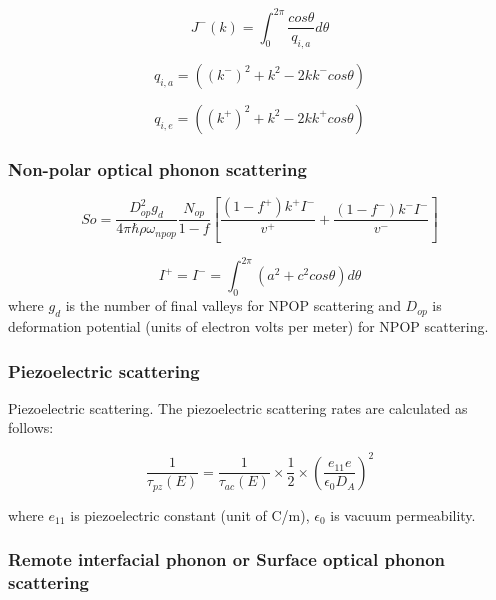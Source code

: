 \documentclass[12pt]{article}
\begin{document}
\begin{equation}
J^{-}(k) = \int_0^{2\pi} \frac{cos \theta}{q_{i,a}} d\theta 
\label{J_plus}
\end{equation}

\begin{equation}
q_{i,a} = \left( \left( k^{-}\right)^2 + k^2 - 2k k^{-} cos \theta \right)
\label{q_ab}
\end{equation}

\begin{equation}
q_{i,e} = \left( \left( k^{+}\right)^2 + k^2  - 2k k^{+} cos \theta \right)
\label{q_em}
\end{equation}

\subsubsection{Non-polar optical phonon scattering}
\begin{equation}
So = \frac{D_{op}^2 g_d}{4\pi\hbar\rho\omega_{npop}} \frac{N_{op}}{1-f} \left[  \frac{(1-f^+)k^+ I^-}{v^+} + \frac{(1-f^-)k^- I^-}{v^-}  \right]
    \label{So}
\end{equation}

\begin{equation}
I^+ = I^- = \int_0^{2\pi}(a^2 + c^2 cos\theta) d\theta
    \label{I_plus}
\end{equation}
where $g_d$ is the number of final valleys for NPOP scattering and $D_{op}$ is deformation potential (units of electron volts per meter) for NPOP scattering.

\subsubsection{Piezoelectric scattering}
Piezoelectric scattering. The piezoelectric scattering rates \cite{kaasbjerg2013acoustic} are calculated as follows: 

\begin{equation}
\frac{1}{\tau_{pz}(E)} = \frac{1}{\tau_{ac}(E)} \times \frac{1}{2}\times \left( \frac{e_{11} e}{\epsilon_0 D_{A}}\right) ^2 
\label{acoustic_rate}
\end{equation}

where $e_{11}$ is piezoelectric constant (unit of C/m), $\epsilon_0$ is vacuum permeability.   

\subsubsection{Remote interfacial phonon or Surface optical phonon scattering}
\end{document}
